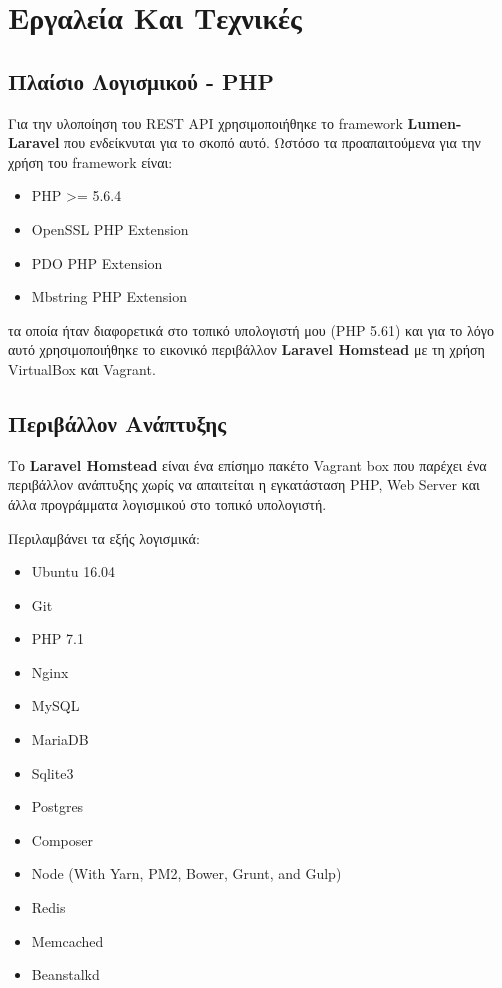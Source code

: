 \section{Εργαλεία Και Τεχνικές}
\subsection{Πλαίσιο Λογισμικού - PHP}
Για την υλοποίηση του REST API χρησιμοποιήθηκε το framework\footnotemark{} \textbf{Lumen-Laravel} \cite{lumen-laravel} που ενδείκνυται για το σκοπό αυτό. Ωστόσο τα προαπαιτούμενα για την χρήση του framework είναι:  

\begin{itemize}
\item PHP >= 5.6.4
\item OpenSSL PHP Extension
\item PDO PHP Extension
\item Mbstring PHP Extension
\end{itemize}

τα οποία ήταν διαφορετικά στο τοπικό υπολογιστή μου (PHP 5.61) και για το λόγο αυτό χρησιμοποιήθηκε το εικονικό περιβάλλον \textbf{Laravel Homstead} \cite{laravel-homestead} με τη χρήση VirtualBox\footnotemark{} και Vagrant\footnotemark{}.

\subsection{Περιβάλλον Ανάπτυξης}

Το \textbf{Laravel Homstead}\cite{laravel-homestead} είναι ένα επίσημο πακέτο Vagrant box που παρέχει ένα περιβάλλον ανάπτυξης χωρίς να απαιτείται η εγκατάσταση PHP, Web Server και άλλα προγράμματα λογισμικού στο τοπικό υπολογιστή.

Περιλαμβάνει τα εξής λογισμικά:

\begin{itemize}
\item Ubuntu 16.04
\item Git
\item PHP 7.1
\item Nginx
\item MySQL
\item MariaDB
\item Sqlite3
\item Postgres
\item Composer
\item Node (With Yarn, PM2, Bower, Grunt, and Gulp)
\item Redis
\item Memcached
\item Beanstalkd
\end{itemize}

